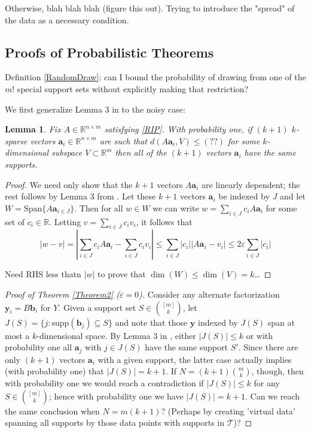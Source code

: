 \documentclass[journal, onecolumn]{IEEEtran}
\newtheorem{lemma}{Lemma}
\begin{document}
Otherwise, blah blah blah (figure this out). Trying to introduce the "spread" of the data as a necessary condition.


\subsection{Proofs of Probabilistic Theorems}\label{PUTproof}

Definition \ref{RandomDraw}: can I bound the probability of drawing from one of the $m!$ special support sets without explicitly making that restriction?

We first generalize Lemma 3 in \cite{Hillar15} to the noisy case:

\begin{lemma}
Fix $A \in \mathbb{R}^{n \times m}$ satisfying \eqref{RIP}. With probability one, if $(k+1)$ $k$-sparse vectors $\mathbf{a}_i \in \mathbb{R}^{n \times m}$ are such that $d(A\mathbf{a}_i,V) \leq (??)$ for some $k$-dimensional subspace $V \subset \mathbb{R}^m$ then all of the $(k+1)$ vectors $\mathbf{a}_i$ have the same supports.
\end{lemma}
\begin{proof}
We need only show that the $k+1$ vectors $A\mathbf{a}_i$ are linearly dependent; the rest follows by Lemma 3 from \cite{Hillar15}. Let these $k+1$ vectors $\mathbf{a}_i$ be indexed by $J$ and let $W = \text{Span}\{A\mathbf{a}_{i \in J}\}$. Then for all $w \in W$ we can write $w = \sum_{i \in J} c_iA\mathbf{a}_i$ for some set of $c_i \in \mathbb{R}$. Letting $v = \sum_{i \in J} c_iv_i$, it follows that
\[ |w - v| = |\sum_{i \in J} c_i A\mathbf{a}_i - \sum_{i \in J} c_i v_i | 
\leq \sum_{i \in J} |c_i| |A\mathbf{a}_i - v_i| \leq 2\varepsilon \sum_{i \in J}|c_i| \]

Need RHS less thatn $|w|$ to prove that $\dim(W) \leq \dim(V) = k$\ldots
\end{proof}

\begin{proof}[Proof of Theorem \ref{Theorem2} ($\varepsilon = 0$)]
Consider any alternate factorization $\mathbf{y}_i = B\mathbf{b}_i$ for $Y$. Given a support set $S \in {[m]\choose k}$, let $J(S) = \{j: \text{supp}(\mathbf{b}_j) \subseteq S\}$ and note that those $\mathbf{y}$ indexed by $J(S)$ span at most a $k$-dimensional space. By Lemma 3 in \cite{Hillar15}, either $|J(S)| \leq k$ or with probability one all $\mathbf{a}_j$ with $j \in J(S)$ have the same support $S'$. Since there are only $(k+1)$ vectors $\mathbf{a}_i$ with a given support, the latter case actually implies (with probability one) that $|J(S)| = k+1$. If $N=(k+1){m \choose k}$, though, then with probability one we would reach a contradiction if $|J(S)| \leq k$ for any $S \in {[m] \choose k}$; hence with probability one we have $|J(S)| = k+1$. Can we reach the same conclusion when $N = m(k+1)$? (Perhaps by creating 'virtual data' spanning all supports by those data points with supports in $\mathcal{T}$)?

\end{proof}
\end{document}
